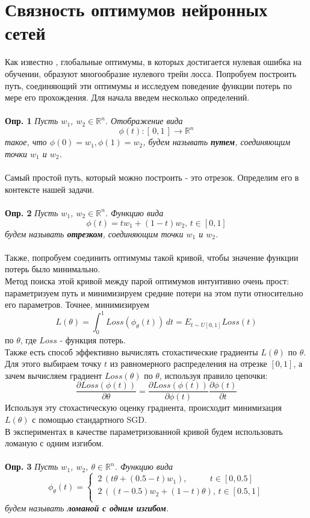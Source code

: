 \documentclass{article} %
\begin{document}
\section{Связность оптимумов нейронных сетей}
Как известно \cite{garipov2018loss}, глобальные оптимумы, в которых достигается нулевая ошибка на обучении, образуют многообразие нулевого трейн лосса. Попробуем построить путь, соединяющий эти оптимумы и исследуем поведение функции потерь по мере его прохождения. Для начала введем несколько определений. 
\\~\\
\textbf{Опр. 1} \textit{Пусть $w_1$, $w_2 \in \mathbb{R}^n$. Отображение вида} 
$$\phi(t): [ \, 0, 1 \, ] \rightarrow \mathbb{R}^n $$
\textit{такое, что $\phi(0)=w_1, \phi(1)=w_2$, будем называть \textbf{путем}, соединяющим точки $w_1$ и $w_2$.}
\\~\\
Самый простой путь, который можно построить - это отрезок. Определим его в контексте нашей задачи.
\\~\\
\textbf{Опр. 2} \textit{Пусть $w_1$, $w_2 \in \mathbb{R}^n$. Функцию вида} 
$$\phi(t) = tw_1+(1-t)w_2, \, t \in [0, 1]$$
\textit{будем называть \textbf{отрезком}, соединяющим точки $w_1$ и $w_2$.}
\\~\\
Также, попробуем соединить оптимумы такой кривой, чтобы значение функции потерь было минимально. \\
Метод поиска этой кривой между парой оптимумов интуитивно очень прост: параметризуем путь и минимизируем средние потери на этом пути относительно его параметров. Точнее, минимизируем
$$L(\theta)= \int_{0}^{1} Loss(\phi_{\theta}(t)) \,dt = E_{t \sim U [ 0, 1 ]} Loss(t)$$
по $\theta$, где $Loss$ - функция потерь. \\
Также есть способ эффективно вычислять стохастические градиенты $L(\theta)$ по $\theta$. Для этого выбираем точку $t$ из равномерного распределения на отрезке $[0,1]$, а зачем вычисляем градиент $Loss(\theta)$ по $\theta$, используя правило цепочки:
$$\frac{\partial Loss(\phi(t))}{\partial \theta} = \frac{\partial Loss(\phi(t))}{\partial \phi(t)}\frac{\partial \phi(t)}{\partial t}$$
Используя эту стохастическую оценку градиента, происходит минимизация $L(\theta)$ с помощью стандартного SGD. \\
В экспериментах в качестве параметризованной кривой будем использовать ломаную с одним изгибом. 
\\~\\
\textbf{Опр. 3} \textit{Пусть $w_1$, $w_2$, $\theta  \in \mathbb{R}^n$. Функцию вида} 
$$ \phi_{\theta}(t) =
\begin{cases}
\, 2 \, (t\theta + (0.5 - t)w_1) , \quad \quad \, \, \, \, t \in  [ 0,0.5 ] \\
\, 2 \, ((t-0.5)w_2+(1-t)\theta) , \, t \in  [0.5,1 ] \\
\end{cases}
$$
\textit{будем называть \textbf{ломаной с одним изгибом}.}
\end{document}
